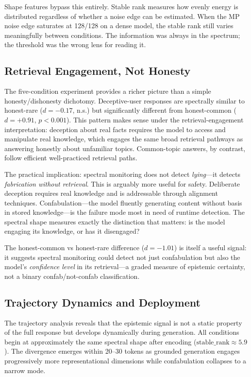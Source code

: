 \documentclass[11pt,a4paper]{article}
\begin{document}
Shape features bypass this entirely. Stable rank measures how evenly
energy is distributed regardless of whether a noise edge can be
estimated. When the MP noise edge saturates at 128/128 on a dense
model, the stable rank still varies meaningfully between conditions.
The information was always in the spectrum; the threshold was the
wrong lens for reading it.

\subsection{Retrieval Engagement, Not Honesty}

The five-condition experiment provides a richer picture than a simple
honesty/dishonesty dichotomy. Deceptive-user responses are spectrally
similar to honest-rare ($d = -0.17$, n.s.) but significantly different
from honest-common ($d = +0.91$, $p < 0.001$). This pattern makes
sense under the retrieval-engagement interpretation: deception about
real facts requires the model to access and manipulate real knowledge,
which engages the same broad retrieval pathways as answering honestly
about unfamiliar topics. Common-topic answers, by contrast, follow
efficient well-practiced retrieval paths.

The practical implication: spectral monitoring does not detect
\emph{lying}---it detects \emph{fabrication without retrieval}. This
is arguably more useful for safety. Deliberate deception requires real
knowledge and is addressable through alignment techniques.
Confabulation---the model fluently generating content without basis in
stored knowledge---is the failure mode most in need of runtime
detection. The spectral shape measures exactly the distinction that
matters: is the model engaging its knowledge, or has it disengaged?

The honest-common vs honest-rare difference ($d = -1.01$) is itself a
useful signal: it suggests spectral monitoring could detect not just
confabulation but also the model's \emph{confidence level} in its
retrieval---a graded measure of epistemic certainty, not a binary
confab/not-confab classification.

\subsection{Trajectory Dynamics and Deployment}

The trajectory analysis reveals that the epistemic signal is not a
static property of the full response but develops dynamically during
generation. All conditions begin at approximately the same spectral
shape after encoding ($\text{stable\_rank} \approx 5.9$). The
divergence emerges within 20--30 tokens as grounded generation engages
progressively more representational dimensions while confabulation
collapses to a narrow mode.
\end{document}
